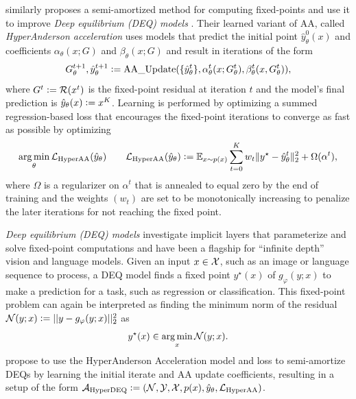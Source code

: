 \documentclass[twoside,11pt]{article}
\begin{document}
\citet{bai2022neural} similarly proposes a semi-amortized
method for computing fixed-points and use it to
improve \emph{Deep equilibrium (DEQ) models}
\citep{bai2019deep,bai2020multiscale,gurumurthy2021joint}.
Their learned variant of AA, called \emph{HyperAnderson acceleration}
uses models that predict the initial point $\hat y^0_\theta(x)$
and coefficients $\alpha_\theta(x; G)$ and $\beta_\theta(x; G)$
and result in iterations of the form
\begin{equation}
  G^{t+1}_\theta, \hat y^{t+1}_\theta \vcentcolon=
  {\rm AA\_Update}(\{\hat y^t_\theta\},
    \alpha^t_\theta(x; G^t_\theta), \beta^t_\theta(x, G^t_\theta)),
  \label{eq:hyperaa}
\end{equation}
where $G^t\vcentcolon= {\mathcal{R}}(x^t)$ is the fixed-point residual at
iteration $t$ and the model's final prediction is
$\hat y_\theta(x)\vcentcolon= x^K$.
Learning is performed by optimizing a summed regression-based loss
that encourages the fixed-point iterations to converge
as fast as possible by optimizing
\begin{equation}
  \operatorname*{arg\,min}_\theta {\mathcal{L}}_{\rm HyperAA}(\hat y_\theta) \qquad {\mathcal{L}}_{\rm HyperAA}(\hat y_\theta) \vcentcolon= \operatorname{\mathbb{E}}_{x\sim p(x)} \sum_{t=0}^K w_t \|y^\star - \hat y_\theta^t\|_2^2 + \Omega(\alpha^t),
  \label{eq:hyperaa-loss}
\end{equation}
where $\Omega$ is a regularizer on $\alpha^t$ that is annealed
to equal zero by the end of training and the
weights $(w_t)$ are set to be monotonically increasing to
penalize the later iterations for not reaching the fixed point.

\emph{Deep equilibrium (DEQ) models} \citep{bai2019deep,bai2020multiscale}
investigate implicit layers that parameterize and solve
fixed-point computations and have been a flagship for
``infinite depth'' vision and language models.
Given an input $x\in{\mathcal{X}}$, such as an image or language sequence
to process, a DEQ model finds a fixed point $y^\star(x)$
of $g_\varphi(y; x)$ to make a prediction for a task,
such as regression or classification.
This fixed-point problem can again be interpreted as
finding the minimum norm of the residual
${\mathcal{N}}(y; x)\vcentcolon= ||y-g_\varphi(y;x)||_2^2$
as
\begin{equation}
  y^\star(x)\in \operatorname*{arg\,min}_x {\mathcal{N}}(y; x).
  \label{eq:deq-opt}
\end{equation}
\citet{bai2022neural} propose to use the HyperAnderson Acceleration
model and loss to semi-amortize DEQs by learning the initial
iterate and AA update coefficients, resulting in a setup of the form
${\mathcal{A}}_{\rm HyperDEQ}\vcentcolon=({\mathcal{N}}, {\mathcal{Y}}, {\mathcal{X}}, p(x), \hat y_\theta, {\mathcal{L}}_{\rm HyperAA})$.
\end{document}
